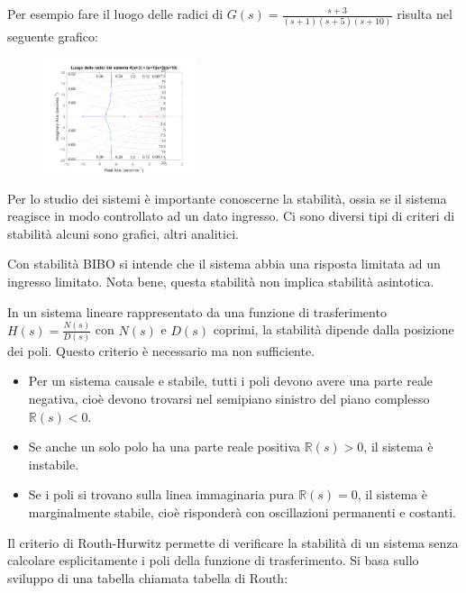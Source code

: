 Per esempio fare il luogo delle radici di $G(s) = \frac{s + 3}{(s + 1)(s + 5)(s + 10)}$ risulta nel seguente grafico:
\begin{figure}[h]
    \centering
    \includegraphics[width=0.4\textwidth]{Immagini/luogo_delle_radici.png}
\end{figure}



Per lo studio dei sistemi è importante conoscerne la stabilità, ossia se il sistema reagisce in modo controllato ad un dato ingresso.
Ci sono diversi tipi di criteri di stabilità alcuni sono grafici, altri analitici.

Con stabilità BIBO si intende che il sistema abbia una risposta limitata ad un ingresso limitato. Nota bene, questa stabilità non implica stabilità asintotica.


In un sistema lineare rappresentato da una funzione di trasferimento \(H(s)=\frac{N(s)}{D(s)}\) con \(N(s)\) e \(D(s)\) coprimi, la stabilità dipende dalla posizione dei poli. Questo criterio è necessario ma non sufficiente.

\begin{itemize}
    \item Per un sistema causale e stabile, tutti i poli devono avere una parte reale negativa, cioè devono trovarsi nel semipiano sinistro del piano complesso \(\mathbb{R}(s)<0\).
    \item Se anche un solo polo ha una parte reale positiva \(\mathbb{R}(s)>0\), il sistema è instabile.
    \item Se i poli si trovano sulla linea immaginaria pura \(\mathbb{R}(s)=0\), il sistema è marginalmente stabile, cioè risponderà con oscillazioni permanenti e costanti.
\end{itemize}


Il criterio di Routh-Hurwitz permette di verificare la stabilità di un sistema senza calcolare esplicitamente i poli della funzione di trasferimento. Si basa sullo sviluppo di una tabella chiamata tabella di Routh:

